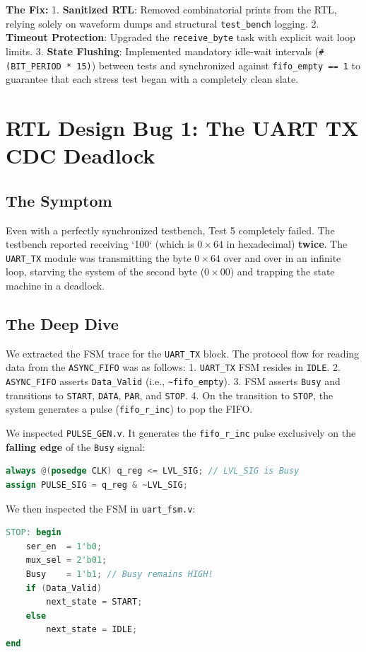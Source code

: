 \documentclass[11pt,a4paper]{article}
\begin{document}
\textbf{The Fix:}
1. \textbf{Sanitized RTL}: Removed combinatorial prints from the RTL, relying solely on waveform dumps and structural \texttt{test\_bench} logging.
2. \textbf{Timeout Protection}: Upgraded the \texttt{receive\_byte} task with explicit wait loop limits.
3. \textbf{State Flushing}: Implemented mandatory idle-wait intervals (\texttt{\#(BIT\_PERIOD * 15)}) between tests and synchronized against \texttt{fifo\_empty == 1} to guarantee that each stress test began with a completely clean slate.

\section{RTL Design Bug 1: The UART TX CDC Deadlock}

\subsection{The Symptom}
Even with a perfectly synchronized testbench, Test 5 completely failed. The testbench reported receiving `100` (which is $0\times64$ in hexadecimal) \textbf{twice}. The \texttt{UART\_TX} module was transmitting the byte $0\times64$ over and over in an infinite loop, starving the system of the second byte ($0\times00$) and trapping the state machine in a deadlock.

\subsection{The Deep Dive}
We extracted the FSM trace for the \texttt{UART\_TX} block. The protocol flow for reading data from the \texttt{ASYNC\_FIFO} was as follows:
1. \texttt{UART\_TX} FSM resides in \texttt{IDLE}. 
2. \texttt{ASYNC\_FIFO} asserts \texttt{Data\_Valid} (i.e., \texttt{\textasciitilde fifo\_empty}).
3. FSM asserts \texttt{Busy} and transitions to \texttt{START}, \texttt{DATA}, \texttt{PAR}, and \texttt{STOP}.
4. On the transition to \texttt{STOP}, the system generates a pulse (\texttt{fifo\_r\_inc}) to pop the FIFO.

We inspected \texttt{PULSE\_GEN.v}. It generates the \texttt{fifo\_r\_inc} pulse exclusively on the \textbf{falling edge} of the \texttt{Busy} signal:
\begin{lstlisting}[language=Verilog]
always @(posedge CLK) q_reg <= LVL_SIG; // LVL_SIG is Busy
assign PULSE_SIG = q_reg & ~LVL_SIG;
\end{lstlisting}

We then inspected the FSM in \texttt{uart\_fsm.v}:
\begin{lstlisting}[language=Verilog]
STOP: begin
    ser_en  = 1'b0;
    mux_sel = 2'b01; 
    Busy    = 1'b1; // Busy remains HIGH!
    if (Data_Valid)
        next_state = START;
    else
        next_state = IDLE;
end
\end{lstlisting}
\end{document}
